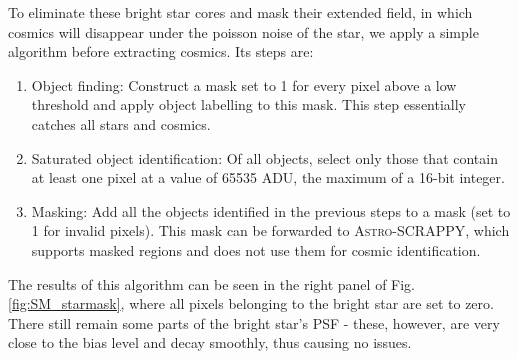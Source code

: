 \documentclass[a4paper, 11pt]{article}
\begin{document}
To eliminate these bright star cores and mask their extended field, in which cosmics will disappear under the poisson noise of the star, we apply a simple algorithm before extracting cosmics. Its steps are:
\begin{enumerate}
  \item Object finding: Construct a mask set to 1 for every pixel above a low threshold and apply object labelling to this mask. This step essentially catches all stars and cosmics.
  \item Saturated object identification: Of all objects, select only those that contain at least one pixel at a value of 65535 ADU, the maximum of a 16-bit integer. 
  \item Masking: Add all the objects identified in the previous steps to a mask (set to 1 for invalid pixels). This mask can be forwarded to \textsc{Astro-SCRAPPY}, which supports masked regions and does not use them for cosmic identification.
\end{enumerate}

The results of this algorithm can be seen in the right panel of Fig. \ref{fig:SM_starmask}, where all pixels belonging to the bright star are set to zero. There still remain some parts of the bright star's PSF - these, however, are very close to the bias level and decay smoothly, thus causing no issues.
\end{document}
